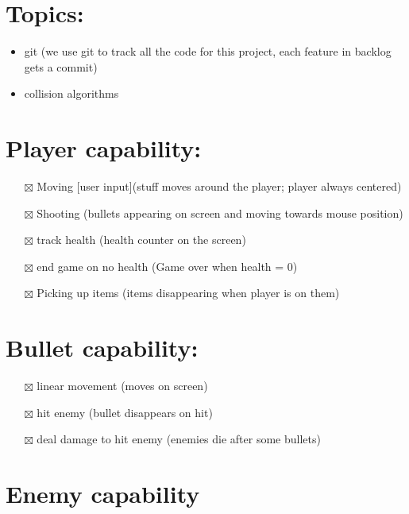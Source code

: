 \documentclass[
]{article}
\author{}
\date{}
\providecommand{\tightlist}{%
  \setlength{\itemsep}{0pt}\setlength{\parskip}{0pt}}
\begin{document}
\section{Topics:}\label{topics}

\begin{itemize}
\tightlist
\item
  git (we use git to track all the code for this project, each feature
  in backlog gets a commit)
\item
  collision algorithms
\end{itemize}

\section{Player capability:}\label{player-capability}

\begin{itemize}
\tightlist
\item[$\boxtimes$]
  Moving {[}user input{]}(stuff moves around the player; player always
  centered)
\item[$\boxtimes$]
  Shooting (bullets appearing on screen and moving towards mouse
  position)
\item[$\boxtimes$]
  track health (health counter on the screen)
\item[$\boxtimes$]
  end game on no health (Game over when health = 0)
\item[$\boxtimes$]
  Picking up items (items disappearing when player is on them)
\end{itemize}

\section{Bullet capability:}\label{bullet-capability}

\begin{itemize}
\tightlist
\item[$\boxtimes$]
  linear movement (moves on screen)
\item[$\boxtimes$]
  hit enemy (bullet disappears on hit)
\item[$\boxtimes$]
  deal damage to hit enemy (enemies die after some bullets)
\end{itemize}

\section{Enemy capability}\label{enemy-capability}
\end{document}
